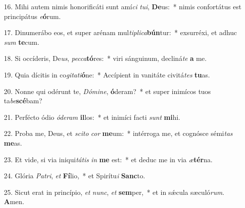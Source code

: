 16. Mihi autem nimis honorificáti sunt amí\textit{ci} \textit{tu}\textit{i}, \textbf{De}us:~*  nimis confortátus est principátus \textit{e}\textbf{ó}rum.\

17. Dinumerábo eos, et super arénam mul\textit{ti}\textit{pli}\textit{ca}\textbf{bún}tur:~*  exsurréxi, et adhuc \textit{sum} \textbf{te}cum.\

18. Si occíderis, De\textit{us}, \textit{pec}\textit{ca}\textbf{tó}res:~*  viri sánguinum, decliná\textit{te} \textbf{a} me.\

19. Quia dícitis in co\textit{gi}\textit{ta}\textit{ti}\textbf{ó}ne:~*  Accípient in vanitáte civitá\textit{tes} \textbf{tu}as.\

20. Nonne qui odérunt te, \textit{Dó}\textit{mi}\textit{ne}, \textbf{ó}deram?~*  et super inimícos tuos ta\textit{be}\textbf{scé}bam?\

21. Perfécto ódio \textit{ó}\textit{de}\textit{ram} \textbf{il}los:~*  et inimíci facti \textit{sunt} \textbf{mi}hi.\

22. Proba me, Deus, et \textit{sci}\textit{to} \textit{cor} \textbf{me}um:~*  intérroga me, et cognósce sémi\textit{tas} \textbf{me}as.\

23. Et vide, si via iniqui\textit{tá}\textit{tis} \textit{in} \textbf{me} est:~*  et deduc me in via \textit{æ}\textbf{tér}na.\

24. Glória \textit{Pa}\textit{tri}, \textit{et} \textbf{Fí}lio,~*  et Spirítu\textit{i} \textbf{Sanc}to.\

25. Sicut erat in princípio, \textit{et} \textit{nunc}, \textit{et} \textbf{sem}per,~*  et in sǽcula sæculó\textit{rum}. \textbf{A}men.\

